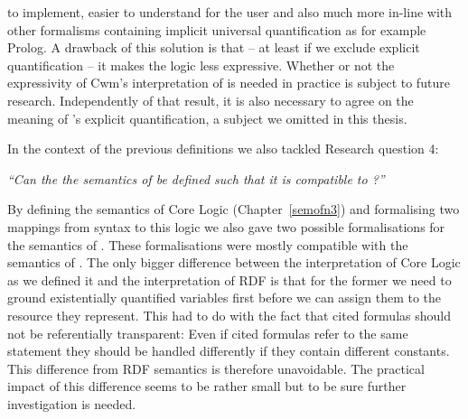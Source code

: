to implement, easier to understand for the user and also much more in-line with other formalisms containing implicit universal quantification as for example Prolog. 
A drawback of this solution is that -- at least if we exclude explicit quantification -- it makes the logic less expressive. Whether or not the expressivity of Cwm's interpretation of 
\nthree is needed in practice is subject to future research. Independently of that result, it is also necessary to agree on the meaning of \nthree's explicit quantification, 
a subject we omitted  in this thesis. 



In the context of the previous 
definitions we also tackled Research question 4:

\emph{``Can the the semantics of \nthreelogic be defined such that it is compatible to \rdf?''}

By defining the semantics of \nthree Core Logic (Chapter~\ref{semofn3}) and formalising two mappings from \nthree syntax to this logic we also gave two possible 
formalisations for the semantics of \nthree. These formalisations were mostly compatible with the semantics of \rdf. 
The only bigger difference between the interpretation of \nthree Core Logic as we defined it and the interpretation of RDF
is that for the former we need to ground existentially quantified variables 
first before we can assign them to the resource they represent. This had to do with the fact that cited  \nthree formulas should not be referentially transparent:
Even if cited formulas refer to the same statement they should be handled differently if they contain different constants. This difference 
from RDF semantics is therefore unavoidable. The practical impact of this difference seems to be rather small but to be sure  further investigation is needed.

